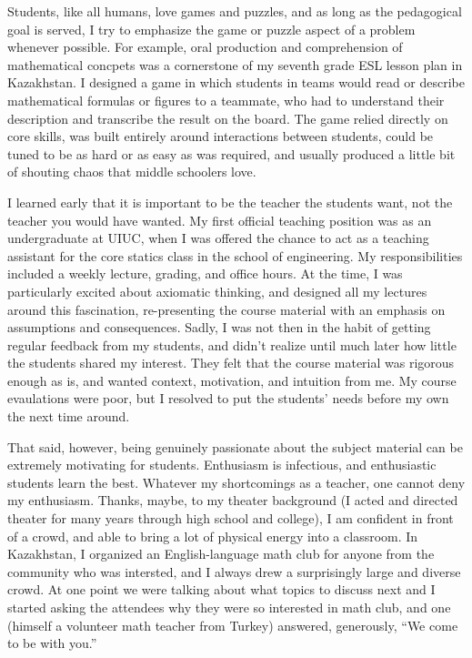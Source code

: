 Students, like all humans, love games and puzzles, and as long as the
pedagogical goal is served, I try to emphasize the game or puzzle aspect of a
problem whenever possible.  For example, oral production and comprehension of
mathematical concpets was a cornerstone of my seventh grade ESL lesson plan in
Kazakhstan.  I designed a game in which students in teams would read or describe
mathematical formulas or figures to a teammate, who had to understand their
description and transcribe the result on the board.  The game relied directly on
core skills, was built entirely around interactions between students, could be
tuned to be as hard or as easy as was required, and usually produced a little
bit of shouting chaos that middle schoolers love.

I learned early that it is important to be the teacher the students want, not
the teacher you would have wanted.  My first official teaching position was as
an undergraduate at UIUC, when I was offered the chance to act as a teaching
assistant for the core statics class in the school of engineering. My
responsibilities included a weekly lecture, grading, and office hours. At the
time, I was particularly excited about axiomatic thinking, and designed all my
lectures around this fascination, re-presenting the course material with an
emphasis on assumptions and consequences.  Sadly, I was not then in the habit of
getting regular feedback from my students, and didn't realize until much later
how little the students shared my interest.  They felt that the course material
was rigorous enough as is, and wanted context, motivation, and intuition from
me.  My course evaulations were poor, but I resolved to put the students'
needs before my own the next time around.

That said, however, being genuinely passionate about the subject material can be
extremely motivating for students.  Enthusiasm is infectious, and enthusiastic
students learn the best.  Whatever my shortcomings as a teacher, one cannot deny
my enthusiasm.  Thanks, maybe, to my theater background (I acted and directed
theater for many years through high school and college), I am confident in front
of a crowd, and able to bring a lot of physical energy into a classroom.  In
Kazakhstan, I organized an English-language math club for anyone from the
community who was intersted, and I always drew a surprisingly large and diverse
crowd.  At one point we were talking about what topics to discuss next and
I started asking the attendees why they were so interested in math club, and
one (himself a volunteer math teacher from Turkey) answered, generously,
``We come to be with you.''


